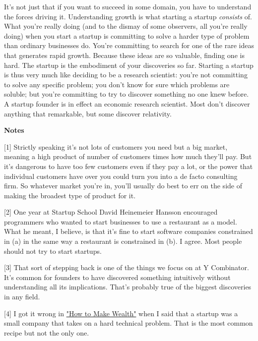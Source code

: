 It's not just that if you want to succeed in some domain, you have
to understand the forces driving it.  Understanding growth is what
starting a startup \emph{consists} of.  What you're really doing (and
to the dismay of some observers, all you're really doing) when you
start a startup is committing to solve a harder type of problem
than ordinary businesses do.  You're committing to search for one
of the rare ideas that generates rapid growth.  Because these ideas
are so valuable, finding one is hard.  The startup is the embodiment
of your discoveries so far.  Starting a startup is thus very much
like deciding to be a research scientist: you're not committing to
solve any specific problem; you don't know for sure which problems
are soluble; but you're committing to try to discover something no
one knew before.  A startup founder is in effect an economic research
scientist.  Most don't discover anything that remarkable, but some
discover relativity.










\textbf{Notes}

[1]
Strictly speaking it's not lots of customers you need but a big
market, meaning a high product of number of customers times how
much they'll pay.  But it's dangerous to have too few customers
even if they pay a lot, or the power that individual customers have
over you could turn you into a de facto consulting firm.  So whatever
market you're in, you'll usually do best to err on the side of
making the broadest type of product for it.

[2]
One year at Startup School David Heinemeier Hansson encouraged
programmers who wanted to start businesses to use a restaurant as
a model.  What he meant, I believe, is that it's fine to start
software companies constrained in (a) in the same way a restaurant
is constrained in (b).  I agree.  Most people should not try to
start startups.

[3]
That sort of stepping back is one of the things we focus on at
Y Combinator.  It's common for founders to have discovered something
intuitively without understanding all its implications.  That's
probably true of the biggest discoveries in any field.

[4]
I got it wrong in \href{http://www.paulgraham.com/wealth.html}{"How to Make Wealth"} when I said that a
startup was a small company that takes on a hard technical
problem.  That is the most common recipe but not the only one.

